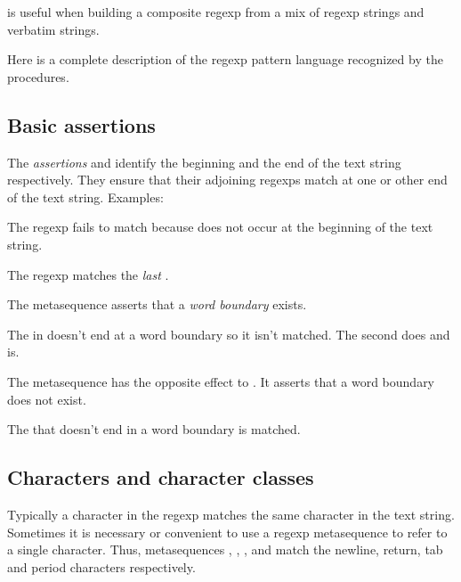 {

 is useful when building a composite
regexp from a mix of regexp strings and verbatim strings.


Here is a complete description of the regexp pattern
language recognized by the  procedures.

\subsection{Basic assertions}

The {\em assertions} \p{^} and \p{$} identify the
beginning and the end of the text string respectively.
They ensure that their adjoining regexps match at
one or other end of the text string.
Examples:


\n The regexp fails to match because  does not
occur at the beginning of the text string.


\n The regexp matches the {\em last} .

The metasequence \p{\b} asserts that
a {\em word boundary} exists.


\n The  in  doesn't end at a word
boundary so it isn't matched.  The second  does
and is.

The metasequence \p{\B} has the opposite effect
to \p{\b}.   It asserts that a word boundary
does not exist.


\n The  that doesn't end in a word boundary
is matched.

\subsection{Characters and character classes}

Typically a character in the regexp matches the same
character in the text string.  Sometimes it is
necessary or convenient to use a regexp
metasequence to refer to a single character.
Thus, metasequences \p{\n}, \p{\r}, \p{\t}, and \p{\.}
match the newline, return, tab and period characters
respectively.

}
